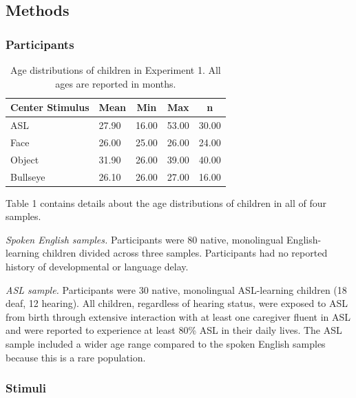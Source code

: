 \documentclass[english,floatsintext,man]{apa6}
\begin{document}
\hypertarget{methods}{%
\subsection{Methods}\label{methods}}

\hypertarget{participants}{%
\subsubsection{Participants}\label{participants}}

\begin{table}[tbp]
\begin{center}
\begin{threeparttable}
\caption{\label{tab:trio make participants table}Age distributions of children in Experiment 1. All ages are reported in months.}
\begin{tabular}{lllll}
\toprule
Center Stimulus & \multicolumn{1}{c}{Mean} & \multicolumn{1}{c}{Min} & \multicolumn{1}{c}{Max} & \multicolumn{1}{c}{n}\\
\midrule
ASL & 27.90 & 16.00 & 53.00 & 30.00\\
Face & 26.00 & 25.00 & 26.00 & 24.00\\
Object & 31.90 & 26.00 & 39.00 & 40.00\\
Bullseye & 26.10 & 26.00 & 27.00 & 16.00\\
\bottomrule
\end{tabular}
\end{threeparttable}
\end{center}
\end{table}

Table 1 contains details about the age distributions of children in all
of four samples.

\emph{Spoken English samples.} Participants were 80 native, monolingual
English-learning children divided across three samples. Participants had
no reported history of developmental or language delay.

\emph{ASL sample.} Participants were 30 native, monolingual ASL-learning
children (18 deaf, 12 hearing). All children, regardless of hearing
status, were exposed to ASL from birth through extensive interaction
with at least one caregiver fluent in ASL and were reported to
experience at least 80\% ASL in their daily lives. The ASL sample
included a wider age range compared to the spoken English samples
because this is a rare population.

\hypertarget{stimuli}{%
\subsubsection{Stimuli}\label{stimuli}}
\end{document}
